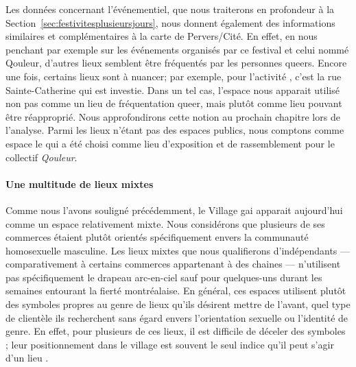 Les données concernant l'événementiel, que nous traiterons en profondeur à la Section~\ref{sec:festivitesplusieursjours}, nous donnent également des informations similaires et complémentaires à la carte de Pervers/Cité.
En effet, en nous penchant par exemple sur les événements organisés par ce festival et celui nommé Qouleur, d'autres lieux semblent être fréquentés par les personnes queers.
Encore une fois, certains lieux sont à nuancer; par exemple, pour l'activité , c'est la rue Sainte-Catherine qui est investie.
Dans un tel cas, l'espace nous apparait utilisé non pas comme un lieu de fréquentation queer, mais plutôt comme lieu pouvant être réapproprié.
Nous approfondirons cette notion au prochain chapitre lors de l'analyse.
Parmi les lieux n'étant pas des espaces publics, nous comptons comme espace le \mai{} qui a été choisi comme lieu d'exposition et de rassemblement pour le collectif \emph{Qouleur}.

\paragraph{Une multitude de lieux mixtes}
Comme nous l'avons souligné précédemment, le Village gai apparait aujourd'hui comme un espace relativement mixte.
Nous considérons que plusieurs de ses commerces étaient plutôt orientés spécifiquement envers la communauté homosexuelle masculine.
Les lieux mixtes que nous qualifierons d'indépendants --- comparativement à certains commerces appartenant à des chaines --- n'utilisent pas spécifiquement le drapeau arc-en-ciel sauf pour quelques-uns durant les semaines entourant la fierté montréalaise.
En général, ces espaces utilisent plutôt des symboles propres au genre de lieux qu'ils désirent mettre de l'avant, quel type de clientèle ils recherchent sans égard envers l'orientation sexuelle ou l'identité de genre.
En effet, pour plusieurs de ces lieux, il est difficile de déceler des symboles \lgbt{}; leur positionnement dans le village est souvent le seul indice qu'il peut s'agir d'un lieu \lgbt{}.

